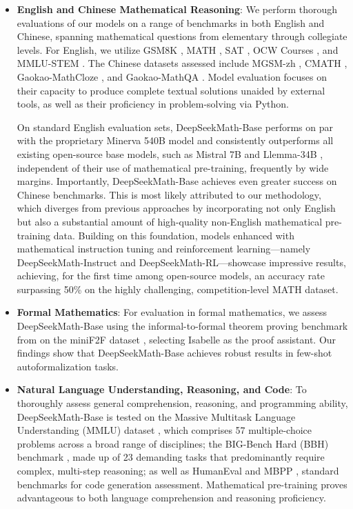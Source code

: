 \begin{itemize}[topsep=0pt]
    \item \textbf{English and Chinese Mathematical Reasoning}: We perform thorough evaluations of our models on a range of benchmarks in both English and Chinese, spanning mathematical questions from elementary through collegiate levels. For English, we utilize GSM8K \citep{gsm8k}, MATH \citep{MATH}, SAT \citep{llemma}, OCW Courses \citep{minerva}, and MMLU-STEM \citep{mmlu}. The Chinese datasets assessed include MGSM-zh \citep{mgsm}, CMATH \citep{wei2023cmath}, Gaokao-MathCloze \citep{agieval}, and Gaokao-MathQA \citep{agieval}. Model evaluation focuses on their capacity to produce complete textual solutions unaided by external tools, as well as their proficiency in problem-solving via Python.

On standard English evaluation sets, DeepSeekMath-Base performs on par with the proprietary Minerva 540B model \citep{minerva} and consistently outperforms all existing open-source base models, such as Mistral 7B \citep{mistral} and Llemma-34B \citep{llemma}, independent of their use of mathematical pre-training, frequently by wide margins. Importantly, DeepSeekMath-Base achieves even greater success on Chinese benchmarks. This is most likely attributed to our methodology, which diverges from previous approaches \citep{minerva,llemma} by incorporating not only English but also a substantial amount of high-quality non-English mathematical pre-training data. Building on this foundation, models enhanced with mathematical instruction tuning and reinforcement learning—namely DeepSeekMath-Instruct and DeepSeekMath-RL—showcase impressive results, achieving, for the first time among open-source models, an accuracy rate surpassing 50\% on the highly challenging, competition-level MATH dataset.

\item \textbf{Formal Mathematics}: For evaluation in formal mathematics, we assess DeepSeekMath-Base using the informal-to-formal theorem proving benchmark from \citep{dsp_proof} on the miniF2F dataset \citep{minif2f}, selecting Isabelle \citep{isabelle} as the proof assistant. Our findings show that DeepSeekMath-Base achieves robust results in few-shot autoformalization tasks.
\item \textbf{Natural Language Understanding, Reasoning, and Code}: To thoroughly assess general comprehension, reasoning, and programming ability, DeepSeekMath-Base is tested on the Massive Multitask Language Understanding (MMLU) dataset \citep{mmlu}, which comprises 57 multiple-choice problems across a broad range of disciplines; the BIG-Bench Hard (BBH) benchmark \citep{bbh}, made up of 23 demanding tasks that predominantly require complex, multi-step reasoning; as well as HumanEval \citep{codex} and MBPP \citep{mbpp}, standard benchmarks for code generation assessment. Mathematical pre-training proves advantageous to both language comprehension and reasoning proficiency.


\end{itemize}
